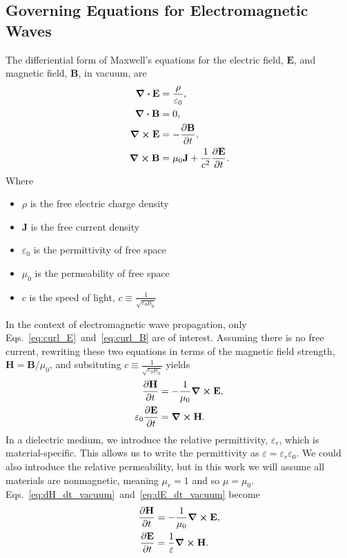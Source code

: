 \documentclass[12pt]{article}
\begin{document}
\begin{multicols}{2}
\section{Governing Equations for Electromagnetic Waves}
The differiential form of Maxwell's equations for the electric field, $\mathbf{E}$, and magnetic field, $\mathbf{B}$, in vacuum, are~\cite{Jackson99}
\begin{subequations}
\begin{align}
\div{\mathbf{E}} &= \frac{\rho}{\varepsilon_0}, \\
\div{\mathbf{B}} &= 0, \\
\label{eq:curl_E}\curl{\mathbf{E}}&= -\frac{\partial\mathbf{B}}{\partial t}, \\
\label{eq:curl_B}\curl{\mathbf{B}}&= \mu_0\mathbf{J}+\frac{1}{c^2}\frac{\partial\mathbf{E}}{\partial t}.
\end{align}
\end{subequations}
Where
\begin{itemize}
\item $\rho$ is the free electric charge density
\item $\mathbf{J}$ is the free current density
\item $\varepsilon_0$ is the permittivity of free space
\item $\mu_0$ is the permeability of free space
\item $c$ is the speed of light, $c\equiv\frac{1}{\sqrt{\varepsilon_0\mu_0}}$
\end{itemize}
In the context of electromagnetic wave propagation, only Eqs.~\ref{eq:curl_E}~and~\ref{eq:curl_B} are of interest. Assuming there is no free current, rewriting these two equations in terms of the magnetic field strength, $\mathbf{H}=\mathbf{B}/\mu_0$, and subsituting $c\equiv\frac{1}{\sqrt{\varepsilon_0\mu_0}}$ yields
\begin{subequations}
\begin{align}
\label{eq:dH_dt_vacuum}\frac{\partial\mathbf{H}}{\partial t} &= -\frac{1}{\mu_0}\curl{\mathbf{E}}, \\
\label{eq:dE_dt_vacuum}\varepsilon_0\frac{\partial\mathbf{E}}{\partial t} &= \curl{\mathbf{H}}.
\end{align}
\end{subequations}
In a dielectric medium, we introduce the relative permittivity, $\varepsilon_r$, which is material-specific. This allows us to write the permittivity as $\varepsilon=\varepsilon_r\varepsilon_0$. We could also introduce the relative permeability, but in this work we will assume all materials are nonmagnetic, meaning $\mu_r=1$ and so $\mu=\mu_0$. Eqs.~\ref{eq:dH_dt_vacuum}~and~\ref{eq:dE_dt_vacuum} become
\begin{subequations}
\begin{align}
\frac{\partial\mathbf{H}}{\partial t} &= -\frac{1}{\mu_0}\curl{\mathbf{E}}, \\
\frac{\partial\mathbf{E}}{\partial t} &= \frac{1}{\varepsilon}\curl{\mathbf{H}}.
\end{align}
\end{subequations}


\end{multicols}
\end{document}
